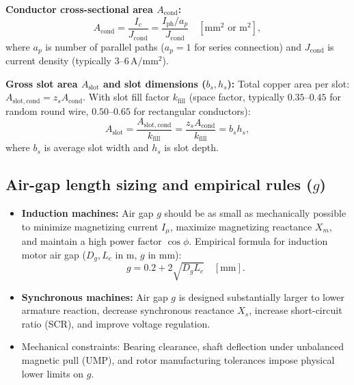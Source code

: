 \textbf{Conductor cross-sectional area $A_{\mathrm{cond}}$:}
\[
\boxed{A_{\mathrm{cond}} = \frac{I_c}{J_{\mathrm{cond}}} = \frac{I_{\mathrm{ph}}/a_p}{J_{\mathrm{cond}}}}\quad[\mathrm{mm^2}\text{ or }\mathrm{m^2}],
\]
where $a_p$ is number of parallel paths ($a_p=1$ for series connection) and $J_{\mathrm{cond}}$ is current density (typically $3\text{--}6\,\mathrm{A/mm^2}$).

\textbf{Gross slot area $A_{\mathrm{slot}}$ and slot dimensions ($b_s, h_s$):}
Total copper area per slot: $A_{\mathrm{slot,cond}} = z_s A_{\mathrm{cond}}$.
With slot fill factor $k_{\mathrm{fill}}$ (space factor, typically $0.35\text{--}0.45$ for random round wire, $0.50\text{--}0.65$ for rectangular conductors):
\[
\boxed{A_{\mathrm{slot}} = \frac{A_{\mathrm{slot,cond}}}{k_{\mathrm{fill}}} = \frac{z_s A_{\mathrm{cond}}}{k_{\mathrm{fill}}} = b_s h_s},
\]
where $b_s$ is average slot width and $h_s$ is slot depth.

\subsection{Air-gap length sizing and empirical rules ($g$)}
\begin{itemize}
  \item \textbf{Induction machines:} Air gap $g$ should be as small as mechanically possible to minimize magnetizing current $I_\mu$, maximize magnetizing reactance $X_m$, and maintain a high power factor $\cos\phi$.
  Empirical formula for induction motor air gap ($D_g, L_c$ in m, $g$ in mm):
  \[
  \boxed{g = 0.2 + 2\sqrt{D_g L_c}\quad[\mathrm{mm}]}.
  \]
  \item \textbf{Synchronous machines:} Air gap $g$ is designed substantially larger to lower armature reaction, decrease synchronous reactance $X_s$, increase short-circuit ratio (SCR), and improve voltage regulation.
  \item Mechanical constraints: Bearing clearance, shaft deflection under unbalanced magnetic pull (UMP), and rotor manufacturing tolerances impose physical lower limits on $g$.
\end{itemize}


